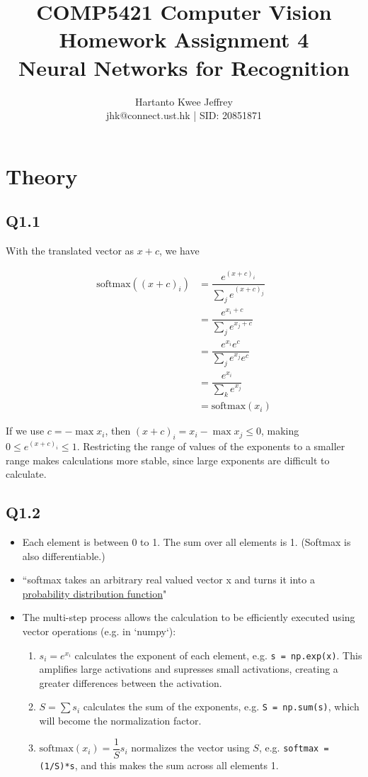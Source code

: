 \documentclass{article} %
\title{\large COMP5421 Computer Vision
\\ \huge Homework Assignment 4
\\ \huge Neural Networks for Recognition}
\author{Hartanto Kwee Jeffrey\\
    \normalsize jhk@connect.ust.hk | SID: 20851871} %
\date{}
\begin{document}
    \maketitle %
    
    \section[1]{Theory} %

    \subsection*{Q1.1}

    With the translated vector as $x+c$, we have

    $$\begin{aligned}
    \text{softmax}((x+c)_i)&=\dfrac{e^{(x+c)_i}}{\sum_j e^{(x+c)_j}} \\ 
    &= \dfrac{e^{x_i+c}}{\sum_j e^{x_j+c}} \\
    &= \dfrac{e^{x_i}e^c}{\sum_j e^{x_j}e^c} \\
    &= \dfrac{e^{x_i}}{\sum_k e^{x_j}} \\
    &= \text{softmax}(x_i)
    \end{aligned}$$

    If we use $c=-\max x_i$, then $(x+c)_i=x_i-\max x_j\leq0$, making $0\leq e^{(x+c)_i}\leq 1$. Restricting the range of values of the exponents to a smaller range makes calculations more stable, since large exponents are difficult to calculate.

    \subsection*{Q1.2}
    \begin{itemize}
        \item Each element is between 0 to 1. The sum over all elements is 1. (Softmax is also differentiable.)
        \item “softmax takes an arbitrary real valued vector x and turns it into a \underline{probability distribution function}"
        \item The multi-step process allows the calculation to be efficiently executed using vector operations (e.g. in `numpy`):
        \begin{enumerate}
            \item $s_i=e^{x_i}$ calculates the exponent of each element, e.g. \verb|s = np.exp(x)|. This amplifies large activations and supresses small activations, creating a greater differences between the activation.
            \item $S=\sum{s_i}$ calculates the sum of the exponents, e.g. \verb|S = np.sum(s)|, which will become the normalization factor.
            \item $\text{softmax}(x_i)=\dfrac{1}{S}s_i$ normalizes the vector using $S$, e.g. \verb|softmax = (1/S)*s|, and this makes the sum across all elements 1.
        \end{enumerate}
    \end{itemize}
    
\end{document}
